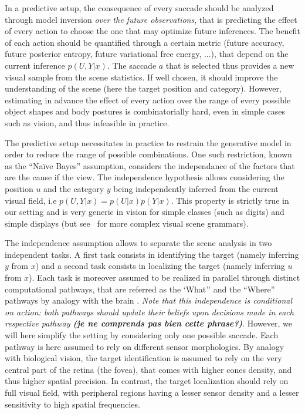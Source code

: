 In a predictive setup, the consequence of every saccade should be analyzed through model inversion \emph{over the future observations}, that is predicting the effect of every action to choose the one that may optimize future inferences. The benefit of each action should be quantified through a certain metric (future accuracy, future posterior entropy, future variational free energy, ...), that depend on the current inference $p(U,Y|x)$. The saccade $a$ that is selected thus provides a new visual sample from the scene statistics. If well chosen, it should improve the understanding of the scene (here the target position and category). However, estimating in advance the effect of every action over the range of every possible object shapes and body postures is combinatorially hard, even in simple cases such as vision, and thus infeasible in practice.

The predictive setup necessitates in practice to restrain the generative model in order to reduce the range of possible combinations. One such restriction, known as the ``Naïve Bayes'' assumption, considers the independance of the factors that are the cause if the view.
The independence hypothesis allows considering the position $u$ and the category $y$ being independently inferred from the current visual field, i.e $p(U,Y|x) = p(U|x) p(Y|x)$. This property is strictly true in our setting and is very generic in vision for simple classes (such as digits) and simple displays (but see~\citep{Vo12} for more complex visual scene grammars). 

The independence assumption allows to separate the scene analysis in two independent tasks. A first task consists in identifying the target (namely inferring $y$ from $x$) and a second task consists in localizing the target (namely inferring $u$ from $x$). Each task is moreover assumed to be realized in parallel through distinct computational pathways, that are referred as the  
`What'' and the ``Where'' pathways by analogy with the brain\ICANN
{}. \emph{Note that %
this independence is conditional on action: both pathways should update their beliefs upon decisions made in each respective pathway {\bf (je ne comprends pas bien cette phrase?)}}\fi. However, we will here  simplify the setting by considering only one possible saccade.
\ICANN
\else
Each pathway is here assumed to rely on different sensor morphologies. By analogy with biological vision, the target identification is assumed to rely on the very central part of the retina (the fovea), that comes with higher cones density, and thus higher spatial precision. In contrast, the target localization should rely on full visual field, with peripheral regions having a lesser sensor density and a lesser sensitivity to high spatial frequencies. 
\fi

